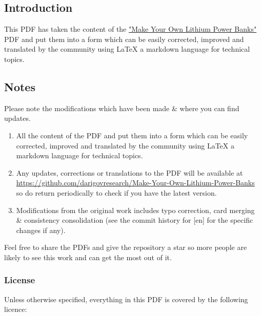 \documentclass{article}
\theoremstyle{definition}
\theoremstyle{definition}
\theoremstyle{remark}
\begin{document}
  \subsection*{Introduction} %
  \label{sub:introduction}
  
    This PDF has taken the content of the \href{https://www.demandenergyequality.org/make-your-own-power-banks}{"Make Your Own Lithium Power Banks"} PDF and put them into a form which can be easily corrected, improved and translated by the community using LaTeX a markdown language for technical topics.


  \subsection*{Notes} %
  \label{sub:notes}

    Please note the modifications which have been made \& where you can find updates.

    \begin{enumerate}
      \item All the content of the PDF and put them into a form which can be easily corrected, improved and translated by the community using LaTeX a markdown language for technical topics.
      \item Any updates, corrections or translations to the PDF will be available at \href{https://github.com/darigovresearch/Make-Your-Own-Lithium-Power-Banks}{https://github.com/darigovresearch/Make-Your-Own-Lithium-Power-Banks} so do return periodically to check if you have the latest version.
      \item Modifications from the original work includes typo correction, card merging \& consistency consolidation (see the commit history for [en] for the specific changes if any).
    \end{enumerate}

    Feel free to share the PDFs and give the repository a star so more people are likely to see this work and can get the most out of it.


  \subsubsection*{License} %
  \label{ssub:license}

    Unless otherwise specified, everything in this PDF is covered by the following licence:
\end{document}
